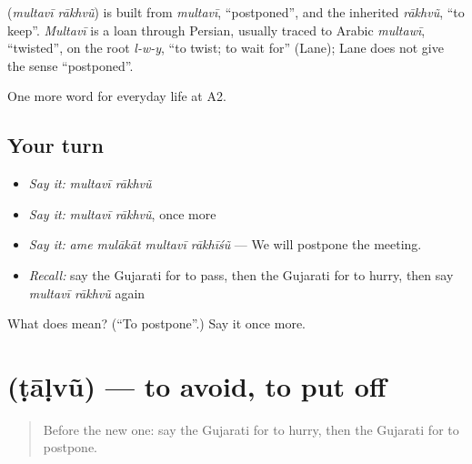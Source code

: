 \begin{cousinweb}
\textbf{ } (\emph{multavī rākhvũ}) is built from \emph{multavī}, \textquotedblleft{}postponed\textquotedblright{}, and the inherited \emph{rākhvũ}, \textquotedblleft{}to keep\textquotedblright{}. \emph{Multavī} is a loan through Persian, usually traced to Arabic \emph{multawī}, \textquotedblleft{}twisted\textquotedblright{}, on the root \emph{l-w-y}, \textquotedblleft{}to twist; to wait for\textquotedblright{} (Lane); Lane does not give the sense \textquotedblleft{}postponed\textquotedblright{}.
\end{cousinweb}

\begin{grammarlens}[title={What you've built}]
One more word for everyday life at A2.
\end{grammarlens}

\subsection*{Your turn}
\begin{itemize}
\raggedright
  \item \emph{Say it:} \emph{multavī rākhvũ}
  \item \emph{Say it:} \emph{multavī rākhvũ}, once more
  \item \emph{Say it:} \emph{ame mulākāt multavī rākhīśũ} — We will postpone the meeting.
  \item \emph{Recall:} say the Gujarati for to pass, then the Gujarati for to hurry, then say \emph{multavī rākhvũ} again
\end{itemize}

\begin{tcolorbox}[breakable,colback=teal!4,colframe=teal!35!black,title={Before you move on}]
What does   mean? (\textquotedblleft{}To postpone\textquotedblright{}.) Say it once more.
\end{tcolorbox}
\section[\texorpdfstring{\gu{ટાળવું} (ṭāḷvũ)}{ટાળવું (ṭāḷvũ)}]{ (ṭāḷvũ) — to avoid, to put off}

\label{lesson:GU-C181-talvu-avoid}



\begin{quote}
Before the new one: say the Gujarati for to hurry, then the Gujarati for to postpone.
\end{quote}


